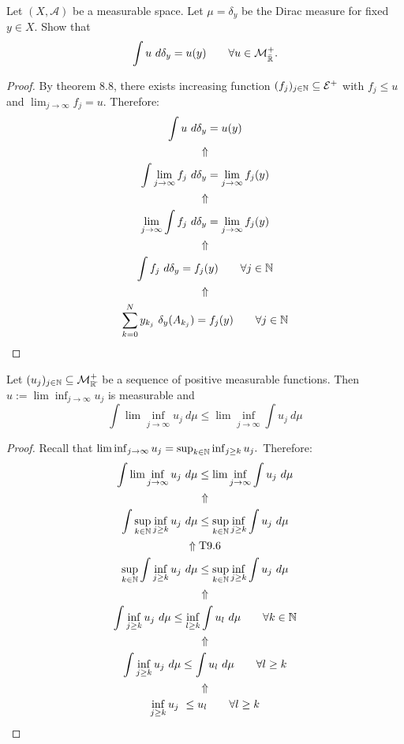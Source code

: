 \begin{prop}
Let \((X,\mathcal{A})\) be a measurable space. Let \(\mu =\delta _{y}\) be the Dirac measure for fixed \(y\in X.\) Show that
\[
\int u\  d\delta _{y}=u(y) \qquad \forall u\in \mathcal{M}_{\bar{\Bbb{R}}}^+.
\]
\end{prop}

\begin{proof}
By theorem 8.8, there exists increasing function \((f_{j})_{j\in \Bbb{N}}\subseteq \mathcal{E}^+\) with \(f_{j}\leq u\) and \(\lim_{j\rightarrow \infty }f_{j}=u.\) Therefore:
\begin{gather*}
\int u\  d\delta _{y}=u(y)\\
\Uparrow  \\
\int \lim_{j\rightarrow \infty }f_{j}\  d\delta _{y} =\lim_{j\rightarrow \infty }f_{j}(y)\\
\Uparrow  \\
\lim_{j\rightarrow \infty } \int f_{j}\  d\delta _{y} = \lim_{j\rightarrow \infty }f_{j}(y) \\
\Uparrow  \\
\int f_{j}\  d\delta _{y} = f_{j}(y) \qquad \forall j\in \Bbb{N}\\
\Uparrow  \\
\sum _{k=0}^N y_{k_{j}}\  \delta _{y}(A_{k_{j}}) = f_{j}(y) \qquad \forall j\in \Bbb{N}
\end{gather*}
\end{proof}


\begin{thm}
Let \((u_{j})_{j\in \Bbb{N}}\subseteq \mathcal{M}_{\Bbb{R}\bar{}}^+\) be a sequence of positive measurable functions. Then \(u:=\lim\inf_{j\rightarrow \infty }u_{j}\) is measurable and
\[
\int  \lim\inf_{j\rightarrow \infty } u_{j}\  d\mu  \leq  \lim\inf_{j\rightarrow \infty } \int u_{j}\  d\mu 
\]
\end{thm}

\begin{proof}
Recall that
\(\lim\inf_{j\rightarrow \infty }u_{j} =\sup_{k\in \Bbb{N}}\inf_{j\geq k} u_{j}.\) Therefore:
\begin{gather*}
\int  \lim\inf_{j\rightarrow \infty } u_{j}\  d\mu  \leq  \lim\inf_{j\rightarrow \infty } \int u_{j}\  d\mu \\
\Uparrow \\
\int \sup_{k\in \Bbb{N}}\inf_{j\geq k} u_{j}\  d\mu  \leq  \sup_{k\in \Bbb{N}}\inf_{j\geq k} \int u_{j}\  d\mu  \\
\Uparrow \text{T9.6}\\
\sup_{k\in \Bbb{N}}\int \inf_{j\geq k} u_{j}\  d\mu  \leq  \sup_{k\in \Bbb{N}}\inf_{j\geq k} \int u_{j}\  d\mu  \\
\Uparrow \\
\int \inf_{j\geq k} u_{j}\  d\mu  \leq  \inf_{l\geq k} \int u_{l}\  d\mu  \qquad \forall k\in \Bbb{N} \\
\Uparrow  \\
\int \inf_{j\geq k} u_{j}\  d\mu  \leq  \int u_{l}\  d\mu  \qquad \forall l\geq k \\
\Uparrow  \\
\inf_{j\geq k} u_{j}\   \leq  u_{l} \qquad \forall l\geq k
\end{gather*}
\end{proof}

